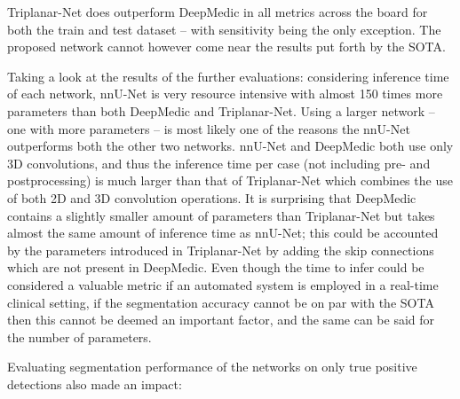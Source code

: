 Triplanar-Net does outperform DeepMedic in all metrics across the board for both the train and test dataset -- with sensitivity being the only exception. The proposed network cannot however come near the results put forth by the SOTA.

Taking a look at the results of the further evaluations: considering inference time of each network, nnU-Net is very resource intensive with almost 150 times more parameters than both DeepMedic and Triplanar-Net. Using a larger network -- one with more parameters -- is most likely one of the reasons the nnU-Net outperforms both the other two networks. nnU-Net and DeepMedic both use only 3D convolutions, and thus the inference time per case (not including pre- and postprocessing) is much larger than that of Triplanar-Net which combines the use of both 2D and 3D convolution operations. It is surprising that DeepMedic contains a slightly smaller amount of parameters than Triplanar-Net but takes almost the same amount of inference time as nnU-Net; this could be accounted by the parameters introduced in Triplanar-Net by adding the skip connections which are not present in DeepMedic. Even though the time to infer could be considered a valuable metric if an automated system is employed in a real-time clinical setting, if the segmentation accuracy cannot be on par with the SOTA then this cannot be deemed an important factor, and the same can be said for the number of parameters.

Evaluating segmentation performance of the networks on only true positive detections also made an impact: 







